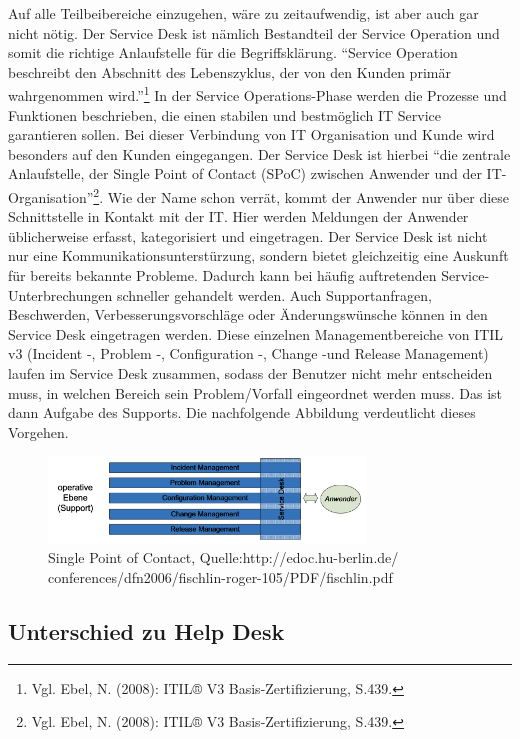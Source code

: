 \noindent
Auf alle Teilbeibereiche einzugehen, wäre zu zeitaufwendig, ist aber auch gar nicht nötig. Der Service Desk ist nämlich Bestandteil der Service Operation und somit die richtige Anlaufstelle für die Begriffsklärung. \newline \enquote{Service Operation beschreibt den Abschnitt des Lebenszyklus, der von den Kunden primär wahrgenommen wird.}\footnote{Vgl. Ebel, N. (2008): ITIL® V3 Basis-Zertifizierung, S.439.} In der Service Operations-Phase werden die Prozesse und Funktionen beschrieben, die einen stabilen  und bestmöglich IT Service garantieren sollen. Bei dieser Verbindung von IT Organisation und Kunde wird besonders auf den Kunden eingegangen. Der Service Desk ist hierbei \enquote{die zentrale Anlaufstelle, der Single Point of Contact (SPoC) zwischen Anwender und der IT-Organisation}\footnote{Vgl. Ebel, N. (2008): ITIL® V3 Basis-Zertifizierung, S.439.}. Wie der Name schon verrät, kommt der Anwender nur über diese Schnittstelle in Kontakt mit der IT. Hier werden Meldungen der Anwender üblicherweise erfasst, kategorisiert und eingetragen. Der Service Desk ist nicht nur eine Kommunikationsunterstürzung, sondern bietet gleichzeitig eine Auskunft für bereits bekannte Probleme. Dadurch kann bei häufig auftretenden Service-Unterbrechungen schneller gehandelt werden. Auch Supportanfragen, Beschwerden, Verbesserungsvorschläge oder Änderungswünsche können in den Service Desk eingetragen werden. Diese einzelnen Managementbereiche von ITIL v3 (Incident -, Problem -, Configuration -, Change -und Release Management) laufen im Service Desk zusammen, sodass der Benutzer nicht mehr entscheiden muss, in welchen Bereich sein Problem/Vorfall eingeordnet werden muss. Das ist dann Aufgabe des Supports. Die nachfolgende Abbildung verdeutlicht dieses Vorgehen.

\begin{figure}[h!]
\centering
	\includegraphics[width=0.75\textwidth]{Abbildungen/SPOC_2.png}
	\caption[Single Point of Contact]{Single Point of Contact, Quelle:http://edoc.hu-berlin.de/
	conferences/dfn2006/fischlin-roger-105/PDF/fischlin.pdf}
	\label{fig:ITIL_Lebenyzyklus}
\end{figure}

\subsection{Unterschied zu Help Desk}

